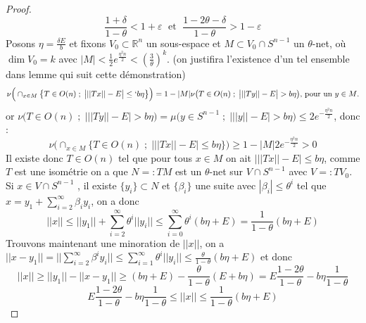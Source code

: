 \documentclass{report}
\begin{document}
\begin{proof}
	\begin{equation*}
		\frac{1+\delta}{1-\theta}<1+\varepsilon \; \text{ et } \; \frac{1-2\theta -\delta}{1-\theta}>1-\varepsilon
	\end{equation*}
	Posons $\eta = \frac{\delta E}{b}$ et fixons $V_0\subset \mathbb{R}^n$ un sous-espace et $M\subset V_0\cap S^{n-1}$ un $\theta$-net, où $\dim V_0 = k$ \color{red}avec $|M|< \frac{1}{2}e^{\frac{\eta^2n}{2}}< (\frac{3}{\theta})^k$. \color{black} (on justifira l'existence d'un tel ensemble dans lemme qui suit cette démonstration)
	\begin{equation*}
		\nu\Big(\cap_{x\in M}\big\{T\in O(n)\; ; \;  \big| ||Tx||-E \big|\leq`  b\eta\big\}\Big)= 1-|M|\nu\big(T\in O(n)\; ; \; \big| ||Ty||-E \big|>b\eta\big) \text{,  pour un $y\in M$.}
	\end{equation*} 
	or $\nu\big(T\in O(n)\; ; \; \big| ||Ty||-E \big|>b\eta\big) = \mu\Big(y\in S^{n-1}\; ;\; \big| ||y||-E \big|>b\eta\Big)\leq 2e^{-\frac{\eta^2n}{2}}$, donc :
	\begin{equation*}
		\nu\Big(\cap_{x\in M}\big\{T\in O(n)\; ; \;  \big| ||Tx||-E \big|\leq b\eta\big\}\Big)\geq 1-|M|2 e^{-\frac{\eta^2 n}{2}}>0
	\end{equation*} 
	Il existe donc $T\in O(n)$ tel que pour tous $x\in M$ on ait $\big|||Tx||-E \big|\leq b \eta$, comme $T$ est une isométrie on a que $N=: TM$ est un $\theta$-net sur $V\cap S^{n-1}$ avec $V=:TV_0$.\\
	Si $x\in V\cap S^{n-1}$ , \color{red}il existe $\{y_i\}\subset N$ et $\{\beta_i\}$ une suite avec $|\beta_i|\leq \theta^i $  tel que $x = y_1 + \sum_{i=2}^{\infty} \beta_i y_i$,
	\color{black} 
	on a donc 
	\begin{equation*}
		||x||\leq ||y_1|| + \sum_{i=2}^{\infty} \theta ^{i} ||y_i||\leq \sum_{i=0}^{\infty}\theta^i (b\eta+E)=\frac{1}{1-\theta}(b\eta + E)
	\end{equation*}
	Trouvons maintenant une minoration de $||x||$, on a $||x-y_1||=\Big|\Big|\sum_{i=2}^{\infty}\beta^i y_i \Big|\Big|\leq \sum_{i=1}^{\infty}\theta^i || y_i|| \leq \frac{\theta}{1-\theta}(b\eta + E)$
	et donc 
	\begin{equation*}
		||x||\geq ||y_1|| - ||x-y_1|| \geq (b\eta + E) - \frac{\theta}{1-\theta}(E+b\eta)=E\frac{1-2\theta}{1-\theta}-b\eta\frac{1}{1-\theta}
	\end{equation*}
	\begin{equation*}
		E\frac{1-2\theta}{1-\theta}-b\eta\frac{1}{1-\theta} \leq ||x|| \leq \frac{1}{1-\theta}(b\eta + E)
	\end{equation*}

\end{proof}
\end{document}
